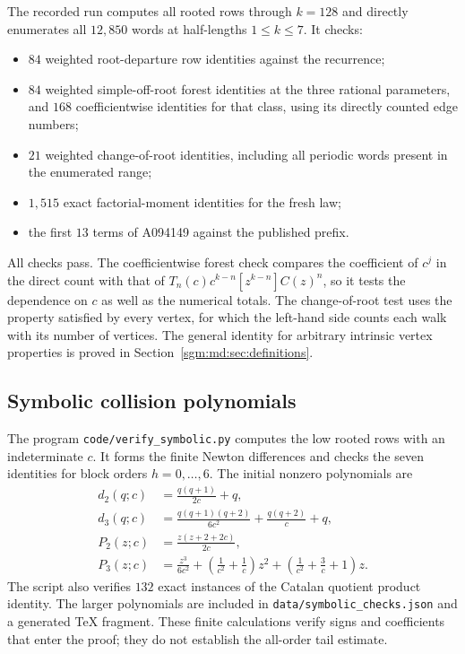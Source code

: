 \documentclass[11pt,letterpaper]{article}
\theoremstyle{remark}\newtheorem{remark}[theorem]{Remark}
\theoremstyle{definition}\newtheorem{definition}[theorem]{Definition}
\begin{document}
The recorded run computes all rooted rows through $k=128$ and directly
enumerates all $12{,}850$ words at half-lengths $1\le k\le7$. It checks:
\begin{itemize}
 \item $84$ weighted root-departure row identities against the recurrence;
 \item $84$ weighted simple-off-root forest identities at the three
       rational parameters, and $168$ coefficientwise identities for
       that class, using its directly counted edge numbers;
 \item $21$ weighted change-of-root identities, including all periodic
       words present in the enumerated range;
 \item $1{,}515$ exact factorial-moment identities for the fresh law;
 \item the first $13$ terms of A094149 against the published prefix.
\end{itemize}
All checks pass. The coefficientwise forest check compares the
coefficient of $c^j$ in the direct count with that of
$T_n(c)c^{k-n}[z^{k-n}]C(z)^n$, so it tests the dependence on $c$
as well as the numerical totals. The change-of-root test uses the
property satisfied by every vertex, for which the left-hand side
counts each walk with its number of vertices. The general identity
for arbitrary intrinsic vertex properties is proved in
Section~\ref{sgm:md:sec:definitions}.

\subsection{Symbolic collision polynomials}

The program \texttt{code/verify\_symbolic.py} computes the low rooted
rows with an indeterminate $c$. It forms the finite Newton differences
and checks the seven identities for block orders $h=0,\ldots,6$.
The initial nonzero polynomials are
\begin{align*}
 d_2(q;c)&=\frac{q(q+1)}{2c}+q,\\
 d_3(q;c)&=\frac{q(q+1)(q+2)}{6c^2}
                       +\frac{q(q+2)}c+q,\\
 P_2(z;c)&=\frac{z(z+2+2c)}{2c},\\
 P_3(z;c)&=\frac{z^3}{6c^2}
       +\left(\frac1{c^2}+\frac1c\right)z^2
       +\left(\frac1{c^2}+\frac3c+1\right)z.
\end{align*}
The script also verifies $132$ exact instances of the Catalan quotient
product identity. The larger polynomials are included in
\texttt{data/symbolic\_checks.json} and a generated TeX fragment.
These finite calculations verify signs and coefficients that enter
the proof; they do not establish the all-order tail estimate.
\end{document}
